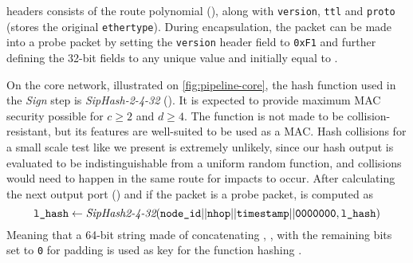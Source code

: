 \polka headers consists of the route polynomial (\routeid), along with \texttt{version}, \texttt{ttl} and \texttt{proto} (stores the original \texttt{ethertype}).
During encapsulation, the packet can be made into a probe packet by setting the \texttt{version} header field to \texttt{0xF1} and further defining the 32-bit fields \timestamp to any unique value and \lhash initially equal to \timestamp.

On the core network, illustrated on \autoref{fig:pipeline-core}, the hash function used in the \textit{Sign} step is \textit{SipHash-2-4-32}\cite{siphash} (\siphash). It is expected to provide maximum MAC security possible for $c \geq 2$ and $d \geq 4$. The function is not made to be collision-resistant, but its features are well-suited to be used as a MAC\cite{siphash}. 
Hash collisions for a small scale test like we present is extremely unlikely, since our hash output is evaluated to be indistinguishable from a uniform random function, and collisions would need to happen in the same route for impacts to occur.
After calculating the next output port (\nhop) and if the packet is a probe packet, \lhash is computed as
$$
\texttt{l\_hash} \leftarrow \textit{SipHash2-4-32}(\texttt{node\_id} || \texttt{nhop} || \texttt{timestamp} || \texttt{0000000}, \texttt{l\_hash})
$$
Meaning that a 64-bit string made of concatenating \nodeid, \nhop, \timestamp with the remaining bits set to \texttt{0} for padding is used as key for the \siphash function hashing \lhash. 
